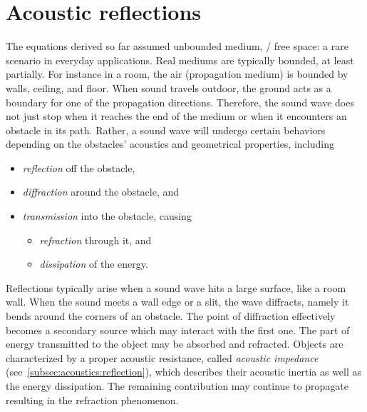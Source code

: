 \section{Acoustic reflections}\label{ch:acoustics:sec:reflection}
The equations derived so far assumed unbounded medium, \ie/ free space: a rare scenario in everyday applications.
Real mediums are typically bounded, at least partially.
For instance in a room, the air (propagation medium) is bounded by walls, ceiling, and floor.
When sound travels outdoor, the ground acts as a boundary for one of the propagation directions.
Therefore, the sound wave does not just stop when it reaches the end of the medium or when it encounters an obstacle in its path.
Rather, a sound wave will undergo certain behaviors depending on the obstacles' acoustics and geometrical properties, including
\begin{itemize}
    \item \textit{reflection} off the obstacle,
    \item \textit{diffraction} around the obstacle, and
    \item \textit{transmission} into the obstacle, causing
    \begin{itemize}
        \item \textit{refraction} through it, and
        \item \textit{dissipation} of the energy.
    \end{itemize}
\end{itemize}
Reflections typically arise when a sound wave hits a large surface, like a room wall.
When the sound meets a wall edge or a slit, the wave diffracts, namely it bends around the corners of an obstacle.
The point of diffraction effectively becomes a secondary source which may interact with the first one.
The part of energy transmitted to the object may be absorbed and refracted.
Objects are characterized by a proper acoustic resistance, called \textit{acoustic impedance} (see~\cref{subsec:acoustics:reflection}), which
describes their acoustic inertia as well as the energy dissipation.
The remaining contribution may continue to propagate resulting in the refraction phenomenon.

\begin{figure}[t]
    \begin{fullwidth}
        \resizebox{\linewidth}{!}{
            
            }
        \label{fig:acoustics:sound_interaction}
    \end{fullwidth}
\end{figure}

